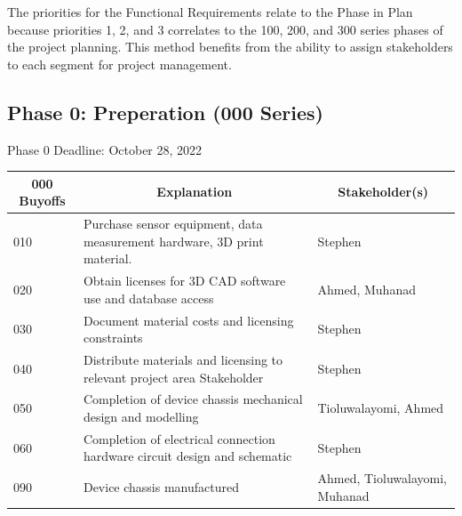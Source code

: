\documentclass[12pt,titlepage]{article}
\begin{document}
The priorities for the Functional Requirements relate to the Phase in Plan because priorities 1, 2, and 3 correlates to the 100, 200, and 300 series phases of the project planning. This method benefits from the ability to assign stakeholders to each segment for project management.

\newpage

\noindent
\subsection{Phase 0: Preperation (000 Series)}
Phase 0 Deadline: October 28, 2022\\

\begin{table}[H]
  \centering
  \begin{tabular}{|p{2cm}|p{10cm}|p{2cm}|}
  \hline
  \multicolumn{1}{|c|}{\textbf{000 Buyoffs}} & \multicolumn{1}{c|}{\textbf{Explanation}} & \multicolumn{1}{|c|}{\textbf{Stakeholder(s)}}
  \\ \hline
  010
  & Purchase sensor equipment, data measurement hardware, 3D print material.
  & Stephen
  \newline                                
  \\ \hline

  020                              
  & Obtain licenses for 3D CAD software use and database access
  & Ahmed, Muhanad
  \newline                                
  \\ \hline

  030                          
  & Document material costs and licensing constraints
  & Stephen
  \newline                                
  \\ \hline

  040                                
  & Distribute materials and licensing to relevant project area Stakeholder
  & Stephen 
  \newline                            
  \\ \hline

  050                                
  & Completion of device chassis mechanical design and modelling
  & Tioluwalayomi, Ahmed
  \newline                            
  \\ \hline

  060                                
  & Completion of electrical connection hardware circuit design and schematic
  & Stephen 
  \newline                            
  \\ \hline

  090                                
  & Device chassis manufactured
  & Ahmed, Tioluwalayomi, Muhanad
  \newline                            
  \\ \hline

  \end{tabular}
\end{table}
\newpage
\end{document}

